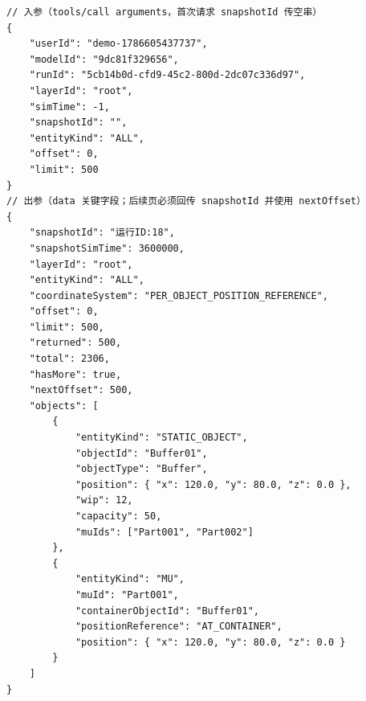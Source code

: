 \begin{lstlisting}
// 入参（tools/call arguments，首次请求 snapshotId 传空串）
{
    "userId": "demo-1786605437737",
    "modelId": "9dc81f329656",
    "runId": "5cb14b0d-cfd9-45c2-800d-2dc07c336d97",
    "layerId": "root",
    "simTime": -1,
    "snapshotId": "",
    "entityKind": "ALL",
    "offset": 0,
    "limit": 500
}
// 出参（data 关键字段；后续页必须回传 snapshotId 并使用 nextOffset）
{
    "snapshotId": "运行ID:18",
    "snapshotSimTime": 3600000,
    "layerId": "root",
    "entityKind": "ALL",
    "coordinateSystem": "PER_OBJECT_POSITION_REFERENCE",
    "offset": 0,
    "limit": 500,
    "returned": 500,
    "total": 2306,
    "hasMore": true,
    "nextOffset": 500,
    "objects": [
        {
            "entityKind": "STATIC_OBJECT",
            "objectId": "Buffer01",
            "objectType": "Buffer",
            "position": { "x": 120.0, "y": 80.0, "z": 0.0 },
            "wip": 12,
            "capacity": 50,
            "muIds": ["Part001", "Part002"]
        },
        {
            "entityKind": "MU",
            "muId": "Part001",
            "containerObjectId": "Buffer01",
            "positionReference": "AT_CONTAINER",
            "position": { "x": 120.0, "y": 80.0, "z": 0.0 }
        }
    ]
}
\end{lstlisting}\vspace{-30pt}

